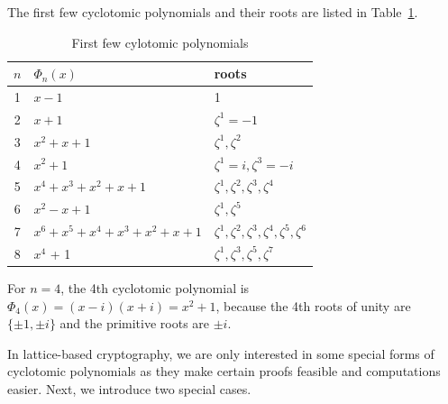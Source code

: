 \documentclass[../main.tex]{subfiles}
\begin{document}
\begin{example}
The first few cyclotomic polynomials and their roots are listed in Table~\ref{tab:first few cyclotomics}.
\begin{table}[!htbp]
    \centering
    \begin{tabular}{|c|l|l|}
        \hline 
    $n$ & $\Phi_n(x)$ & roots \\
        \hline \hline
        1 & $x - 1$ & 1 \\
        \hline
        2 & $x + 1$ & $\zeta^1 = -1$ \\
        \hline
        3 & $x^2 + x + 1$ & $\zeta^1, \zeta^2$ \\
        \hline
        4 & $x^2 + 1$ & $\zeta^1 = i, \zeta^3 = -i$ \\
        \hline
        5 & $x^4 + x^3 + x^2 + x + 1$ & $\zeta^1, \zeta^2, \zeta^3, \zeta^4$ \\
        \hline
        6 & $x^2 - x +1$ & $\zeta^1, \zeta^5$ \\
        \hline
        7 & $x^6 + x^5 + x^4 + x^3 + x^2 + x + 1$ & $\zeta^1, \zeta^2, \zeta^3, \zeta^4, \zeta^5, \zeta^6$ \\
        \hline
        8 & $x^4$ + 1 & $\zeta^1, \zeta^3, \zeta^5, \zeta^7$ \\
        \hline 
    \end{tabular}
    \caption{First few cylotomic polynomials}
    \label{tab:first few cyclotomics}
\end{table}
For $n = 4$, the 4th cyclotomic polynomial is $\Phi_4(x) = (x-i)(x+i)=x^2+1$, because the 4th roots of unity are $\{\pm 1, \pm i\}$ and the primitive roots are $\pm i$. 
\end{example}

In lattice-based cryptography, we are only interested in some special forms of cyclotomic polynomials as they make certain proofs feasible and computations easier. Next, we introduce two special cases. %
\end{document}
